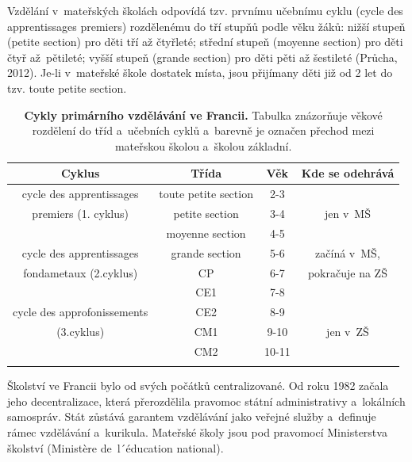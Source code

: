 		Vzdělání v mateřských školách odpovídá tzv. prvnímu učebnímu cyklu (cycle des apprentissages premiers) rozdělenému do tří stupňů podle věku žáků: nižší stupeň (petite section) pro děti tří až čtyřleté; střední stupeň (moyenne section) pro děti čtyř až pětileté; vyšší stupeň (grande section) pro děti pěti až šestileté
		(Průcha, 2012). 
		Je-li v~mateřské škole dostatek místa, jsou přijímany děti již od 2 let do tzv. toute petite section. 

\begin{spacing}{1.0}
\begin{table}[h]
	\center
	\small
	\begin{center}
	\begin{tabular}{|c|ccc|}
		\hline
		\rowcolor{grey}
		\textbf{Cyklus}				& \textbf{Třída}		& \textbf{Věk}	& \textbf{Kde se odehrává}	\\
		\hline
		\hline
		\rowcolor{grey!10}
	\cellcolor{white} cycle des apprentissages	& toute petite section 	& 2-3 		&				\\ \rowcolor{grey!20}
	\cellcolor{white} premiers (1. cyklus)		& petite section 		& 3-4 		& jen v~MŠ 		\\ \rowcolor{grey!20}
	\cellcolor{white}							& moyenne section 		& 4-5 		& 				\\ \rowcolor{grey!20}
		\hline
	\cellcolor{white} cycle des apprentissages 	& grande section 		& 5-6 		& začíná v~MŠ, 		\\ \rowcolor{grey!50}
	\cellcolor{white} fondametaux (2.cyklus) 		& CP 					& 6-7 		& pokračuje na ZŠ 	\\ \rowcolor{grey!50}
	\cellcolor{white}								& CE1 					& 7-8 		& 					\\ \rowcolor{grey!50}
		\hline
	\cellcolor{white} cycle des approfonissements & CE2 					& 8-9 		&					\\ \rowcolor{grey!50}
	\cellcolor{white} (3.cyklus)					& CM1 					& 9-10 		& jen v~ZŠ 			\\ \rowcolor{grey!50}
	\cellcolor{white}								& CM2 					& 10-11 	& 					\\ \rowcolor{grey!50}
		\hline
	\end{tabular}
	\end{center}
	\caption{ \textbf{Cykly primárního vzdělávání ve Francii.} Tabulka znázorňuje věkové rozdělení do tříd a~učebních cyklů a~barevně je označen přechod mezi mateřskou školou a~školou základní. 
	}
	\label{tab:rozdeleniTridFR}
\end{table}
\end{spacing}
		Školství ve Francii bylo od svých počátků centralizované. Od roku 1982 začala jeho decentralizace, která přerozdělila pravomoc státní administrativy a~lokálních samospráv. Stát zůstává garantem vzdělávání jako veřejné služby a~definuje rámec vzdělávání a kurikula. Mateřské školy jsou pod pravomocí Ministerstva školství (Ministère de l´éducation national).


